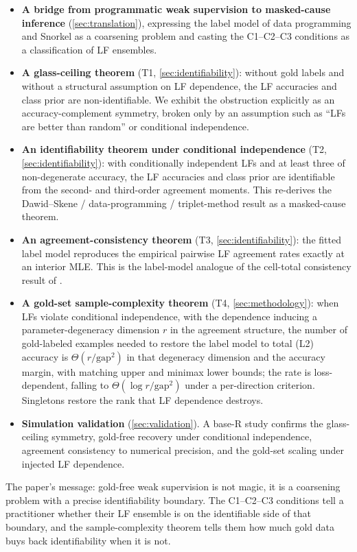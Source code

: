 \begin{itemize}
\item \textbf{A bridge from programmatic weak supervision to
  masked-cause inference} (\cref{sec:translation}), expressing the
  label model of data programming and Snorkel as a coarsening problem
  and casting the C1--C2--C3 conditions as a classification of LF
  ensembles.

\item \textbf{A glass-ceiling theorem} (T1, \cref{sec:identifiability}):
  without gold labels and without a structural assumption on LF
  dependence, the LF accuracies and class prior are non-identifiable.
  We exhibit the obstruction explicitly as an accuracy-complement
  symmetry, broken only by an assumption such as ``LFs are better than
  random'' or conditional independence.

\item \textbf{An identifiability theorem under conditional
  independence} (T2, \cref{sec:identifiability}): with conditionally
  independent LFs and at least three of non-degenerate accuracy, the
  LF accuracies and class prior are identifiable from the second- and
  third-order agreement moments. This re-derives the
  Dawid--Skene / data-programming / triplet-method result as a
  masked-cause theorem.

\item \textbf{An agreement-consistency theorem} (T3,
  \cref{sec:identifiability}): the fitted label model reproduces the
  empirical pairwise LF agreement rates exactly at an interior MLE.
  This is the label-model analogue of the cell-total consistency
  result of \citet{towell2026scrnacoarsening}.

\item \textbf{A gold-set sample-complexity theorem} (T4,
  \cref{sec:methodology}): when LFs violate conditional independence,
  with the dependence inducing a parameter-degeneracy dimension $r$ in
  the agreement structure, the number of gold-labeled examples needed
  to restore the label model to total (L2) accuracy is
  $\Theta(r / \mathrm{gap}^2)$ in that degeneracy dimension and the
  accuracy margin, with matching upper and minimax lower bounds; the
  rate is loss-dependent, falling to $\Theta(\log r / \mathrm{gap}^2)$
  under a per-direction criterion. Singletons restore the rank that LF
  dependence destroys.

\item \textbf{Simulation validation} (\cref{sec:validation}). A
  base-R study confirms the glass-ceiling symmetry, gold-free recovery
  under conditional independence, agreement consistency to numerical
  precision, and the gold-set scaling under injected LF dependence.
\end{itemize}

The paper's message: gold-free weak supervision is not magic, it is a
coarsening problem with a precise identifiability boundary. The
C1--C2--C3 conditions tell a practitioner whether their LF ensemble
is on the identifiable side of that boundary, and the
sample-complexity theorem tells them how much gold data buys back
identifiability when it is not.
